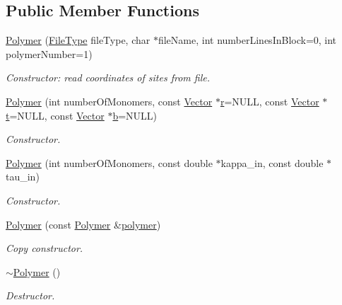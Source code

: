 \subsection*{Public Member Functions}
\begin{DoxyCompactItemize}
\item 
\hyperlink{class_p_c_a_1_1_polymer_ac835d908dc32b787ca80f26cd0e6c68b}{Polymer} (\hyperlink{class_p_c_a_1_1_polymer_a1df36a764fbf04ccd5cbe8edb49d43bd}{File\+Type} file\+Type, char $\ast$file\+Name, int number\+Lines\+In\+Block=0, int polymer\+Number=1)
\begin{DoxyCompactList}\small\item\em Constructor\+: read coordinates of sites from file. \end{DoxyCompactList}\item 
\hyperlink{class_p_c_a_1_1_polymer_ac2645c33eba98a8ec1670d69b92060c8}{Polymer} (int number\+Of\+Monomers, const \hyperlink{class_p_c_a_1_1_vector}{Vector} $\ast$\hyperlink{class_p_c_a_1_1_polymer_a9822e3b9c3420a04a689706b84e586ca}{r}=N\+U\+LL, const \hyperlink{class_p_c_a_1_1_vector}{Vector} $\ast$\hyperlink{class_p_c_a_1_1_polymer_a0fd79e19a8c09a9e4c72903924151b5e}{t}=N\+U\+LL, const \hyperlink{class_p_c_a_1_1_vector}{Vector} $\ast$\hyperlink{class_p_c_a_1_1_polymer_ad93199b0187ab557476153b204b921c7}{b}=N\+U\+LL)
\begin{DoxyCompactList}\small\item\em Constructor. \end{DoxyCompactList}\item 
\hyperlink{class_p_c_a_1_1_polymer_a7d08722028cd9bf11b042a1b3b0e1d37}{Polymer} (int number\+Of\+Monomers, const double $\ast$kappa\+\_\+in, const double $\ast$tau\+\_\+in)
\begin{DoxyCompactList}\small\item\em Constructor. \end{DoxyCompactList}\item 
\hyperlink{class_p_c_a_1_1_polymer_a1ce99540db06e9e48392423ba516cd2f}{Polymer} (const \hyperlink{class_p_c_a_1_1_polymer}{Polymer} \&\hyperlink{classpolymer}{polymer})
\begin{DoxyCompactList}\small\item\em Copy constructor. \end{DoxyCompactList}\item 
\hyperlink{class_p_c_a_1_1_polymer_ac0d31fa5c6bee720f8069805d6669606}{$\sim$\+Polymer} ()
\begin{DoxyCompactList}\small\item\em Destructor. \end{DoxyCompactList}\item 

\end{DoxyCompactItemize}
